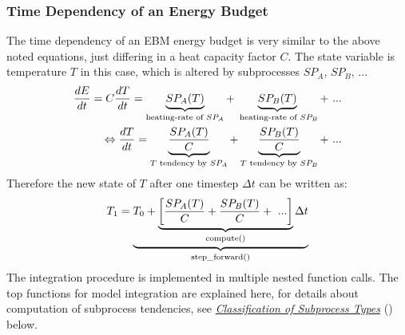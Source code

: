 \documentclass[a4paper,10pt,english]{sphinxmanual}
\begin{document}
\subsubsection{Time Dependency of an Energy Budget}
\label{architecture:time-dependency-of-an-energy-budget}
The time dependency of an EBM energy budget is very similar to the above noted equations, just differing in a heat capacity factor \(C\). The state variable is temperature \(T\) in this case, which is altered by subprocesses \(SP_A\), \(SP_B\), ...
\begin{gather}
\begin{split}\frac{dE}{dt} = C \frac{dT}{dt} = \underbrace{SP_A(T)}_{\textrm{heating-rate of }SP_A} + \underbrace{SP_B(T)}_{\textrm{ heating-rate of }SP_B} + \ ...                          \\
\Leftrightarrow   \frac{dT}{dt} = \underbrace{\frac{SP_A(T)}{C}}_{T \textrm{ tendency by }SP_A} + \underbrace{\frac{SP_B(T)}{C}}_{T \textrm{ tendency by }SP_B} + \ ...\end{split}\notag
\end{gather}
Therefore the new state of \(T\) after one timestep \(\Delta t\) can be written as:
\begin{gather}
\begin{split}T_1 = \underbrace{T_0 + \underbrace{ \left[ \frac{SP_A(T)}{C} + \frac{SP_B(T)}{C} + \ ... \right]}_{\textrm{compute()}}  \Delta t }_{\textrm{step\_forward()}}\end{split}\notag
\end{gather}
The integration procedure is implemented in multiple nested function calls. The top functions for model integration are explained here, for details about computation of subprocess tendencies, see {\hyperref[architecture:classification\string-of\string-subprocess\string-types]{\emph{Classification of Subprocess Types}}} () below.
\end{document}
